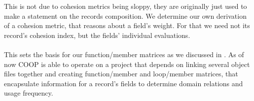 This is not due to cohesion metrics being sloppy, they are originally just used to make a statement on the records composition. We determine our own derivation of a cohesion metric, that reasons about a field's weight. For that we need not its record's cohesion index, but the fields' individual evaluations.\\\\
This sets the basis for our function/member matrices as we discussed in . As of now COOP is able to operate on a project that depends on linking several object files together and creating function/member and loop/member matrices, that encapsulate information for a record's fields to determine domain relations and usage frequency.


